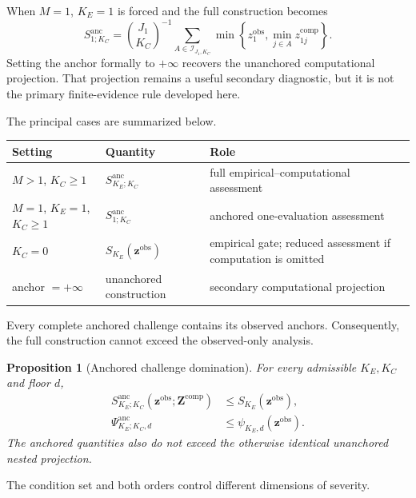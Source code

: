 \documentclass[11pt]{article}
\newcommand{\Sanc}{S^{\mathrm{anc}}}
\newcommand{\Psianc}{\Psi^{\mathrm{anc}}}
\newtheorem{proposition}{Proposition}
\theoremstyle{remark}
\begin{document}
When $M=1$, $K_E=1$ is forced and the full construction becomes
\begin{equation}
\Sanc_{1;K_C}
=
\binom{J_1}{K_C}^{-1}
\sum_{A\in\mathcal I_{J_1,K_C}}
\min\left\{z_1^{\mathrm{obs}},
\min_{j\in A}z_{1j}^{\mathrm{comp}}\right\}.
\label{eq:one-evaluation-boundary}
\end{equation}
Setting the anchor formally to $+\infty$ recovers the unanchored computational
projection. That projection remains a useful secondary
diagnostic, but it is not the primary finite-evidence rule developed here.

The principal cases are summarized below.
\begin{center}
\begin{tabularx}{0.96\textwidth}{@{}lX X@{}}
\toprule
Setting & Quantity & Role \\
\midrule
$M>1$, $K_C\geq1$ & $\Sanc_{K_E;K_C}$ & full empirical--computational assessment \\
$M=1$, $K_E=1$, $K_C\geq1$ & $\Sanc_{1;K_C}$ & anchored one-evaluation assessment \\
$K_C=0$ & $S_{K_E}(\mathbf z^{\mathrm{obs}})$ & empirical gate; reduced assessment if computation is omitted \\
anchor $=+\infty$ & unanchored construction & secondary computational projection \\
\bottomrule
\end{tabularx}
\end{center}

Every complete anchored challenge contains its observed anchors. Consequently,
the full construction cannot exceed the observed-only analysis.

\begin{proposition}[Anchored challenge domination]
\label{prop:anchor-domination}
For every admissible $K_E,K_C$ and floor $d$,
\begin{align}
\Sanc_{K_E;K_C}
\left(\mathbf z^{\mathrm{obs}};\mathbf Z^{\mathrm{comp}}\right)
&\leq
S_{K_E}(\mathbf z^{\mathrm{obs}}),
\label{eq:magnitude-domination}\\
\Psianc_{K_E;K_C,d}
&\leq
\psi_{K_E,d}(\mathbf z^{\mathrm{obs}}).
\label{eq:survival-domination}
\end{align}
The anchored quantities also do not exceed the otherwise identical unanchored
nested projection.
\end{proposition}

The condition set and both orders control different dimensions of severity.
\end{document}
